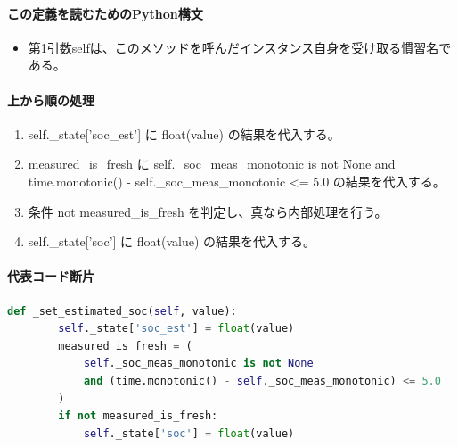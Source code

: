 \documentclass[a4paper,11pt]{article}
\begin{document}
            \paragraph{この定義を読むためのPython構文}
            \begin{itemize}[leftmargin=1.6em]
            \item 第1引数selfは、このメソッドを呼んだインスタンス自身を受け取る慣習名である。
            \end{itemize}
            \paragraph{上から順の処理}
            \begin{enumerate}[leftmargin=1.8em]
            \item self.\_state['soc\_est'] に float(value) の結果を代入する。
\item measured\_is\_fresh に self.\_soc\_meas\_monotonic is not None and time.monotonic() - self.\_soc\_meas\_monotonic <= 5.0 の結果を代入する。
\item 条件 not measured\_is\_fresh を判定し、真なら内部処理を行う。
\item   self.\_state['soc'] に float(value) の結果を代入する。
            \end{enumerate}
            \paragraph{代表コード断片}
            \begin{lstlisting}[language=Python]
    def _set_estimated_soc(self, value):
        self._state['soc_est'] = float(value)
        measured_is_fresh = (
            self._soc_meas_monotonic is not None
            and (time.monotonic() - self._soc_meas_monotonic) <= 5.0
        )
        if not measured_is_fresh:
            self._state['soc'] = float(value)
\end{lstlisting}
\end{document}
